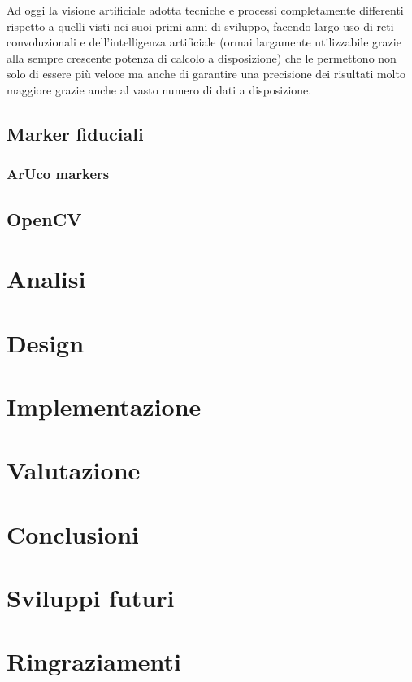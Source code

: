 \documentclass[12pt,a4paper,openright,twoside]{book}
\begin{document}
Ad oggi la visione artificiale adotta tecniche e processi completamente differenti rispetto a quelli visti nei suoi primi anni di sviluppo, facendo largo uso di reti convoluzionali e dell'intelligenza artificiale (ormai largamente utilizzabile grazie alla sempre crescente potenza di calcolo a disposizione) che le permettono non solo di essere più veloce ma anche di garantire una precisione dei risultati molto maggiore grazie anche al vasto numero di dati a disposizione.

\section{Marker fiduciali}
\subsection{ArUco markers}

\section{OpenCV}

\chapter{Analisi}

\chapter{Design}

\chapter{Implementazione}

\chapter{Valutazione}

\chapter{Conclusioni}

\chapter{Sviluppi futuri}

\chapter{Ringraziamenti}
\end{document}
